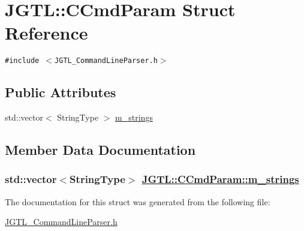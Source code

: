\hypertarget{struct_j_g_t_l_1_1_c_cmd_param}{
\section{JGTL::CCmd\-Param Struct Reference}
\label{struct_j_g_t_l_1_1_c_cmd_param}
}
{\tt \#include $<$JGTL\_\-Command\-Line\-Parser.h$>$}

\subsection*{Public Attributes}
\begin{CompactItemize}
\item 
std::vector$<$ String\-Type $>$ \hyperlink{struct_j_g_t_l_1_1_c_cmd_param_cc792a928e6e61bc7b3e6eac0c41df5c}{m\_\-strings}
\end{CompactItemize}


\subsection{Member Data Documentation}
\hypertarget{struct_j_g_t_l_1_1_c_cmd_param_cc792a928e6e61bc7b3e6eac0c41df5c}{
\subsubsection[m\_\-strings]{\setlength{\rightskip}{0pt plus 5cm}std::vector$<$String\-Type$>$ \hyperlink{struct_j_g_t_l_1_1_c_cmd_param_cc792a928e6e61bc7b3e6eac0c41df5c}{JGTL::CCmd\-Param::m\_\-strings}}}
\label{struct_j_g_t_l_1_1_c_cmd_param_cc792a928e6e61bc7b3e6eac0c41df5c}




The documentation for this struct was generated from the following file:\begin{CompactItemize}
\item 
\hyperlink{_j_g_t_l___command_line_parser_8h}{JGTL\_\-Command\-Line\-Parser.h}\end{CompactItemize}
